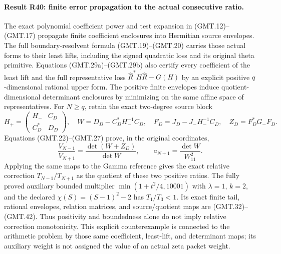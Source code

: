 \paragraph{Result R40: finite error propagation to the actual consecutive ratio.}
The exact polynomial coefficient power and test expansion in
(GMT.12)--(GMT.17) propagate finite coefficient enclosures into
Hermitian source envelopes. The full boundary-resolvent formula
(GMT.19)--(GMT.20) carries those actual forms to their least lifts,
including the signed quadratic loss and its original theta primitive.
Equations (GMT.29a)--(GMT.29b) also certify every coefficient of
the least lift and the full representative loss
$\widehat R^*H\widehat R-G(H)$ by an explicit positive
$q$-dimensional rational upper form.
The positive finite envelopes induce quotient-dimensional determinant
enclosures by minimizing on the same affine space of representatives.
For $N\geq q$, retain the exact two-degree source block
\[
 H_+=\begin{pmatrix}H_-&C_D\\C_D^*&D_D\end{pmatrix},\quad
 W=D_D-C_D^*H_-^{-1}C_D,\quad
 F_D=J_D-J_-H_-^{-1}C_D,\quad Z_D=F_D^*G_-F_D.
\]
Equations (GMT.22)--(GMT.27) prove, in the original coordinates,
\[
 \frac{V_{N-1}}{V_{N+1}}=\frac{\det(W+Z_D)}{\det W},\qquad
 a_{N+1}=\frac{\det W}{W_{11}^2}.
\]
Applying the same maps to the Gamma reference gives the exact
relative correction $T_{N-1}/T_{N+1}$ as the quotient of these
two positive ratios. The fully proved auxiliary bounded multiplier
$\min(1+t^2/4,10001)$ with $\lambda=1$, $k=2$, and the declared
$\chi(S)=(S-1)^2-2$ has $T_1/T_3<1$. Its exact finite tail,
rational envelopes, relation matrices, and source/quotient maps
are (GMT.32)--(GMT.42). Thus positivity and boundedness alone
do not imply relative correction monotonicity. This explicit
counterexample is connected to the arithmetic problem by those
same coefficient, least-lift, and determinant maps; its auxiliary
weight is not assigned the value of an actual zeta packet weight.

